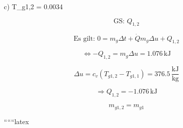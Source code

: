 c) \quad {} T_{g1,2} = 0.0034 \,  

\[
\text{GS: } Q_{1,2}
\]

\[
\text{Es gilt: } 0 = m_g \Delta t + \dot{Q} m_g \Delta u + Q_{1,2}
\]

\[
\Leftrightarrow -Q_{1,2} = m_g \Delta u = 1.076 \, \text{kJ}
\]

\[
\Delta u = c_v (T_{g1,2} - T_{g1,1}) = 376.5 \, \frac{\text{kJ}}{\text{kg}}
\]

\[
\Rightarrow Q_{1,2} = -1.076 \, \text{kJ}
\]

\[
m_{g1,2} = m_{g1}
\]

``````latex